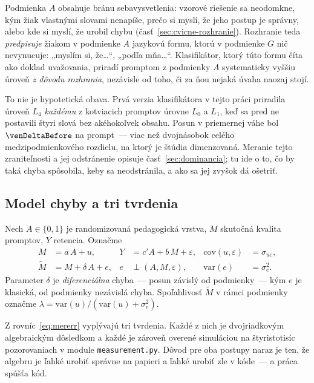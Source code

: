 Podmienka $A$ obsahuje bránu sebavysvetlenia: vzorové riešenie sa neodomkne, kým žiak vlastnými slovami nenapíše, prečo si myslí, že jeho postup je správny, alebo kde si myslí, že urobil chybu (časť~\ref{sec:cvicne-rozhranie}). Rozhranie teda \emph{predpisuje} žiakom v podmienke $A$ jazykovú formu, ktorú v podmienke $G$ nič nevynucuje: „myslím si, že\ldots“, „podľa mňa\ldots“. Klasifikátor, ktorý túto formu číta ako doklad uvažovania, priradí promptom z podmienky $A$ systematicky vyššiu úroveň \emph{z dôvodu rozhrania}, nezávisle od toho, či za ňou nejaká úvaha naozaj stojí.

To nie je hypotetická obava. Prvá verzia klasifikátora v tejto práci priradila úroveň $L_4$ \emph{každému} z \venN{} kotviacich promptov úrovne $L_0$ a $L_1$, keď sa pred ne postavili štyri slová bez akéhokoľvek obsahu. Posun v priemernej váhe bol $\venDeltaBefore$ na prompt~--- viac než dvojnásobok celého medzipodmienkového rozdielu, na ktorý je štúdia dimenzovaná. Meranie tejto zraniteľnosti a jej odstránenie opisuje časť~\ref{sec:dominancia}; tu ide o to, čo by taká chyba spôsobila, keby sa neodstránila, a ako sa jej zvyšok dá ošetriť.

\subsection{Model chyby a tri tvrdenia}

Nech $A\in\{0,1\}$ je randomizovaná pedagogická vrstva, $M$ skutočná kvalita promptov, $Y$ retencia. Označme
\begin{align}
    M &= a\,A + u, & Y &= c'A + b\,M + \varepsilon, & \mathrm{cov}(u,\varepsilon) &= \sigma_{u\varepsilon},\\
    \widetilde{M} &= M + \delta\,A + e, & e &\perp (A, M, \varepsilon), & \mathrm{var}(e) &= \sigma_e^2 .
    \label{eq:mererr}
\end{align}
Parameter $\delta$ je \emph{diferenciálna} chyba~--- posun závislý od podmienky~--- kým $e$ je klasická, od podmienky nezávislá chyba. Spoľahlivosť $\widetilde{M}$ v rámci podmienky označme $\lambda = \mathrm{var}(u)/(\mathrm{var}(u)+\sigma_e^2)$.

Z rovníc~\eqref{eq:mererr} vyplývajú tri tvrdenia. Každé z nich je dvojriadkovým algebraickým dôsledkom a každé je zároveň overené simuláciou na štyristotisíc pozorovaniach v module \texttt{measurement.py}. Dôvod pre oba postupy naraz je ten, že algebru je ľahké urobiť správne na papieri a ľahké urobiť zle v kóde~--- a práca spúšťa kód.

